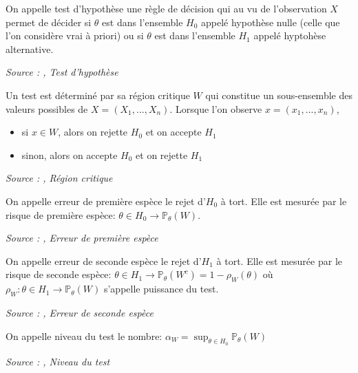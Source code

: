 \begin{definition}\label{def:test_hyptothèse}
On appelle test d'hypothèse une règle de décision qui au vu de l'observation $X$ permet de décider si $\theta$ est dans l'ensemble $H_0$ appelé hypothèse nulle (celle que l'on considère vrai à priori) ou si $\theta$ est dans l'ensemble $H_1$ appelé hyptohèse alternative.

\noindent\textit{Source : \cite{stat_ingenieur},  Test d'hypothèse}
\end{definition}

\begin{definition}\label{def:region_critique}
Un test est déterminé par sa région critique $W$ qui constitue un sous-ensemble des valeurs possibles de $X = (X_1, ..., X_n)$. Lorsque l'on observe $x = (x_1, ..., x_n)$,
\begin{itemize}
    \item si $x \in W$, alors on rejette $H_0$ et on accepte $H_1$
    \item sinon, alors on accepte $H_0$ et on rejette $H_1$
\end{itemize}

\noindent\textit{Source : \cite{stat_ingenieur},  Région critique}
\end{definition}

\begin{definition}\label{def:erreur_premiere_espece}
On appelle erreur de première espèce le rejet d'$H_0$ à tort. Elle est mesurée par le risque de première espèce: $\theta \in H_0 \rightarrow \mathbb{P}_\theta(W)$.

\noindent\textit{Source : \cite{stat_ingenieur},  Erreur de première espèce}
\end{definition}

\begin{definition}\label{def:erreur_seconde_espece}
On appelle erreur de seconde espèce le rejet d'$H_1$ à tort. Elle est mesurée par le risque de seconde espèce: $\theta \in H_1 \rightarrow \mathbb{P}_\theta(W^c) = 1 - \rho_W(\theta)$ où $\rho_W: \theta \in H_1 \rightarrow \mathbb{P}_\theta(W)$ s'appelle puissance du test.

\noindent\textit{Source : \cite{stat_ingenieur},  Erreur de seconde espèce}
\end{definition}

\begin{definition}\label{def:niveau_test}
On appelle niveau du test le nombre: $\alpha_W = \sup_{\theta \in H_0} \mathbb{P}_\theta(W)$

\noindent\textit{Source : \cite{stat_ingenieur},  Niveau du test}
\end{definition}

